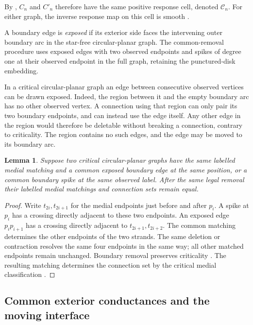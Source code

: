 \documentclass[11pt]{article}
\newtheorem{lemma}[theorem]{Lemma}
\theoremstyle{definition}
\newcommand{\cell}{\mathcal C}
\begin{document}
By \cite[Theorems 2 and 4]{CIM}, $C_n$ and $C'_n$ therefore
have the same positive response cell, denoted $\cell_n$.
For either graph, the inverse response map on this cell is smooth
\cite[Theorem 4]{CIM}.

A boundary edge is \emph{exposed} if its exterior side faces the
intervening outer boundary arc in the star-free circular-planar graph.
The common-removal procedure uses exposed edges with two observed
endpoints and spikes of degree one at their observed endpoint in
the full graph, retaining the punctured-disk embedding.

In a critical circular-planar graph an edge between consecutive observed
vertices can be drawn exposed. Indeed, the region between it and the
empty boundary arc has no other observed vertex. A connection using
that region can only pair its two boundary endpoints, and can instead
use the edge itself. Any other edge in the region would therefore be
deletable without breaking a connection, contrary to criticality.
The region contains no such edges, and the edge may be moved to its
boundary arc.

\begin{lemma}
\label{lem:common-removal}
Suppose two critical circular-planar graphs have the same labelled
medial matching and a common exposed boundary edge at the same
position, or a common boundary spike at the same observed label.
After the same legal removal their labelled medial matchings and
connection sets remain equal.
\end{lemma}
\begin{proof}
Write \(t_{2i},t_{2i+1}\) for the medial endpoints just before and after
\(p_i\). A spike at \(p_i\) has a crossing directly adjacent to these
two endpoints. An exposed edge \(p_ip_{i+1}\) has a crossing directly
adjacent to \(t_{2i+1},t_{2i+2}\).
The common matching determines the other endpoints of the two strands.
The same deletion or contraction resolves the same four endpoints
in the same way; all other matched endpoints remain unchanged.
Boundary removal preserves criticality
\cite[Lemmas 11.1--11.2]{CIM}. The resulting matching determines the
connection set by the critical medial classification \cite[Section 7]{CIM}.
\end{proof}

\subsection{Common exterior conductances and the moving interface}
\end{document}
